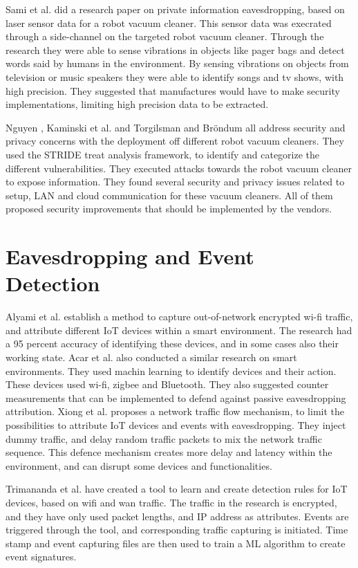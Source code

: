 Sami et al. \cite{lindaeavesdropping} did a research paper on private information eavesdropping, based on laser sensor data for a robot vacuum cleaner.  This sensor data was execrated through a side-channel on the targeted robot vacuum cleaner. Through the research they were able to sense vibrations in objects like pager bags and detect words said by humans in the environment. By sensing vibrations on objects from television or music speakers they were able to identify songs and tv shows, with high precision. They suggested that manufactures would have to make security implementations, limiting high precision data to be extracted.

Nguyen \cite{robotvacuum_voulne_nguyendeep}, Kaminski et al. \cite{robotvacuum_voulne1_kaminski2016averting} and Torgilsman and Bröndum\cite{robotvacuum_voulne2_torgilsman2020ethical} all address security and privacy concerns with the deployment off different robot vacuum cleaners. They used the STRIDE treat analysis framework, to identify and categorize the different vulnerabilities. They executed attacks towards the robot vacuum cleaner to expose information. They found several security and privacy issues related to setup, LAN and cloud communication for these vacuum cleaners. All of them proposed security improvements that should be implemented by the vendors. 

\section{Eavesdropping and Event Detection}
Alyami et al. \cite{Eavs_relat_alyami2022wifi} establish a method to capture out-of-network encrypted wi-fi traffic, and attribute different IoT devices within a smart environment. The research had a 95 percent accuracy of identifying these devices, and in some cases also their working state. Acar et al. \cite{evas_relat_acar2020peek} also conducted a similar research on smart environments. They used machin learning to identify devices and their action. These devices used wi-fi, zigbee and Bluetooth. They also suggested counter measurements that can be implemented to defend against passive eavesdropping attribution.
Xiong et al. \cite{evas_relat_xiong2022network} proposes a network traffic flow mechanism, to limit the possibilities to attribute IoT devices and events with eavesdropping. They inject dummy traffic, and delay random traffic packets to mix the network traffic sequence. This defence mechanism creates more delay and latency within the environment, and can disrupt some devices and functionalities.

Trimananda et al. \cite{pingpong_trimananda2020packet} have created a tool to learn and create detection rules for IoT devices, based on wifi and wan traffic. The traffic in the research is encrypted, and they have only used packet lengths, and IP address as attributes. Events are triggered through the tool, and corresponding traffic capturing is initiated. Time stamp and event capturing files are then used to train a ML algorithm to create event signatures.


